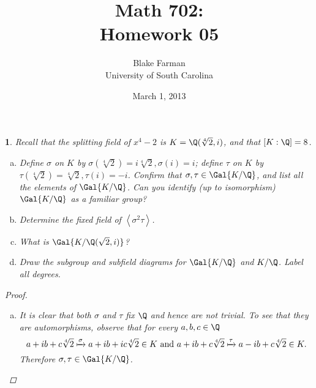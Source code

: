 \documentclass[10pt]{amsart}
\author{Blake Farman\\University of South Carolina}
\title{Math 702:\\Homework 05}
\date{March 1, 2013}
\begin{document}
\maketitle

\providecommand{\p}{\mathfrak{p}}
\providecommand{\m}{\mathfrak{m}}

\newtheorem{thm}{}
\newtheorem{lem}{Lemma}

\newcommand{\End}[2]{\operatorname{End}_{#1}\left(#2\right)}
\newcommand{\Hom}[2]{\operatorname{Hom}_{#1}\left(#2\right)}

\begin{thm}
  Recall that the splitting field of $x^4 - 2$ is $K = \Q(\sqrt[4]{2}, i)$, and that $[K : \Q] = 8$.
  \begin{enumerate}[(a)]
  \item
    Define $\sigma$ on $K$ by $\sigma(\sqrt[4]{2}) = i\sqrt[4]{2}, \sigma(i) = i$;
    define $\tau$ on $K$ by $\tau(\sqrt[4]{2}) = \sqrt[4]{2}, \tau(i) = -i$.
    Confirm that $\sigma, \tau \in \Gal{K/\Q}$, and list all the elements of $\Gal{K/\Q}$.
    Can you identify (up to isomorphism) $\Gal{K/\Q}$ as a familiar group?
  \item
    Determine the fixed field of $\left<\sigma^2\tau\right>$.
  \item
    What is $\Gal{K/\Q(\sqrt{2}, i)}$?
  \item
    Draw the subgroup and subfield diagrams for $\Gal{K/\Q}$ and $K/\Q$.
    Label all degrees.
  \end{enumerate}
  
  \begin{proof}
    \begin{enumerate}[(a)]
    \item
      It is clear that both $\sigma$ and $\tau$ fix $\Q$ and hence are not trivial.
      To see that they are automorphisms, observe that for every $a, b, c \in \Q$
      $$a + ib + c\sqrt[4]{2} \xmapsto{\sigma} a + ib + ic\sqrt[4]{2} \in K\ \text{and}\ a + ib + c\sqrt[4]{2} \xmapsto{\tau} a - ib + c\sqrt[4]{2} \in K.$$
      Therefore $\sigma, \tau \in \Gal{K/\Q}$.
      

\end{enumerate}
\end{proof}
\end{thm}
\end{document}
